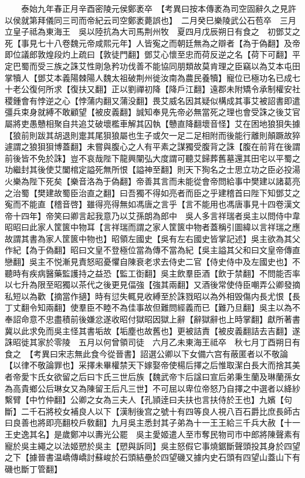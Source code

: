 　　泰始九年春正月辛酉密陵元侯鄭袤卒　【考異曰按本傳袤為司空固辭久之見許以侯就第拜儀同三司而帝紀云司空鄭袤薨誤也】　二月癸巳樂陵武公石苞卒　三月立皇子祗為東海王　吳以陸抗為大司馬荆州牧　夏四月戊辰朔日有食之　初鄧艾之死【事見七十八卷魏元帝咸熙元年】人皆寃之而朝廷無為之辯者【為于偽翻】及帝即位議郎敦煌段灼上疏曰【敦徒門翻】鄧艾心懷至忠而荷反逆之名【荷下可翻】平定巴蜀而受三族之誅艾性剛急矜功伐善不能協同朋類故莫肯理之臣竊以為艾本屯田掌犢人【鄧艾本義陽棘陽人魏太祖破荆州徙汝南為農民養犢】寵位已極功名已成七十老公復何所求【復扶又翻】正以劉禪初降【降戶江翻】遠郡未附矯令承制權安社稷鍾會有悖逆之心【悖蒲内翻又蒲没翻】畏艾威名因其疑似構成其事艾被詔書即遣彊兵束身就縛不敢顧望【被皮義翻】誠知奉見先帝必無當死之理也會受誅之後艾官屬將吏愚戇相聚自共追艾破壞檻車解其囚執【戇直降翻壞音怪】艾在困地狼狽失據【狼前則跋其胡退則疐其尾狽狼屬也生子或欠一足二足相附而後能行離則顛蹶故猝遽謂之狼狽狽博蓋翻】未嘗與腹心之人有平素之謀獨受腹背之誅【腹在前背在後謂前後皆不免於誅】豈不哀哉陛下龍興闡弘大度謂可聽艾歸葬舊墓還其田宅以平蜀之功繼封其後使艾闔棺定謚死無所恨【謚神至翻】則天下狥名之士思立功之臣必投湯火樂為陛下死矣【樂音洛為于偽翻】帝善其言而未能從會帝問給事中樊建以諸葛亮之治蜀【樊建故蜀臣治直之翻】曰吾獨不得如亮者而臣之乎建稽首曰陛下知鄧艾之寃而不能直【稽音啓】雖得亮得無如馮唐之言乎【言不能用也馮唐事見十四卷漢文帝十四年】帝笑曰卿言起我意乃以艾孫朗為郎中　吳人多言祥瑞者吳主以問侍中韋昭昭曰此家人筐篋中物耳【言祥瑞而謂之家人筐篋中物者蓋稱引圖緯以言祥瑞之應故謂其書為家人筐篋中物也】昭領左國史【吳有左右國史皆掌記述】吳主欲為其父作紀【為于偽翻】昭曰文皇不登極位當為傳不當為紀【吳主謚其父和曰文皇帝傳直戀翻】吳主不悦漸見責怒昭憂懼自陳衰老求去侍史二官【侍史侍中及左國史也】不聽時有疾病醫藥監護持之益恐【監工衘翻】吳主飲羣臣酒【飲于禁翻】不問能否率以七升為限至昭獨以茶代之後更見偪強【強其兩翻】又酒後常使侍臣嘲弄公卿發摘私短以為歡【摘當作擿】時有愆失輒見收縛至於誅戮昭以為外相毁傷内長尤恨【長丁丈翻令知兩翻】使羣臣不睦不為佳事故但難問經義而已【難乃旦翻】吳主以為不奉詔命意不忠盡積前後嫌忿遂收昭付獄昭因獄上辭【辭獄辭也上時掌翻】獻所著書冀以此求免而吳主怪其書垢故【垢塵也故舊也】更被詰責【被皮義翻詰去吉翻】遂誅昭徙其家於零陵　五月以何曾領司徒　六月乙未東海王祗卒　秋七月丁酉朔日有食之　【考異曰宋志無此食今從晉書】詔選公卿以下女備六宫有蔽匿者以不敬論【以律不敬論罪也】采擇未畢權禁天下嫁娶帝使楊后擇之后惟取潔白長大而捨其美者帝愛卞氏女欲留之后曰卞氏三世后族【魏武帝卞后諡曰宣后弟秉生蘭及琳蘭孫女為高貴鄉公后琳女又為陳留王后凡三世】不可屈以卑位帝怒乃自擇之中選者以絳紗繫臂【中竹仲翻】公卿之女為三夫人【孔頴逹曰夫扶也言扶侍於王也】九嬪【句斷】二千石將校女補良人以下【漢制後宫之號十有四等良人視八百石爵比庶長師古曰良善也將即亮翻校戶敎翻】九月吳主悉封其子弟為十一王王給三千兵大赦【十一王史逸其名】是歲鄭冲以夀光公罷　吳主愛姬遣人至市奪民物司市中郎將陳聲素有寵於吳主繩之以法姬愬於吳主【愬與訴同】吳主怒假它事燒鋸斷聲頭投其身於四望之下【據晉書温嶠傳嶠討蘇峻於石頭結壘於四望磯又據内史石頭有四望山蓋山下有磯也斷丁管翻】

